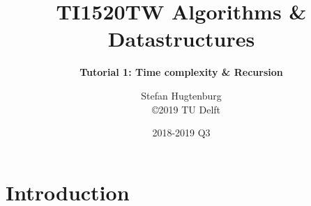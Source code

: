\documentclass[aspectratio=169]{beamer}
\title[Algorithms \& Datastructures]{TI1520TW Algorithms \& Datastructures}
\subtitle{\color{cyan} \textbf{Tutorial 1: Time complexity \& Recursion }}
\author{Stefan Hugtenburg\\ {\tiny{\qquad~~\copyright 2019 TU Delft}}}
\institute{CSE Teaching Team | EEMCS | TU Delft}
\date{2018-2019 Q3}
\begin{document}
\frame{\titlepage}

\section{Introduction}






\frame{\titlepage}
\end{document}
